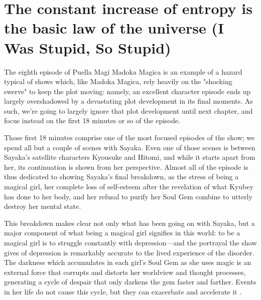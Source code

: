 \chapter{The constant increase of entropy is the basic law of the universe (I Was Stupid, So Stupid)}
The eighth episode of Puella Magi Madoka Magica is an example of a hazard typical of shows which, like Madoka Magica, rely heavily on the "shocking swerve" \cite{ref54} to keep the plot moving: namely, an excellent character episode ends up largely overshadowed by a devastating plot development in its final moments. As such, we're going to largely ignore that plot development until next chapter, and focus instead on the first 18 minutes or so of the episode.

Those first 18 minutes comprise one of the most focused episodes of the show; we spend all but a couple of scenes with Sayaka. Even one of those scenes is between Sayaka's satellite characters Kyousuke and Hitomi, and while it starts apart from her, its continuation is shown from her perspective. Almost all of the episode is thus dedicated to showing Sayaka's final breakdown, as the stress of being a magical girl, her complete loss of self-esteem after the revelation of what Kyubey has done to her body, and her refusal to purify her Soul Gem combine to utterly destroy her mental state.

This breakdown makes clear not only what has been going on with Sayaka, but a major component of what being a magical girl signifies in this world: to be a magical girl is to struggle constantly with depression—and the portrayal the show gives of depression is remarkably accurate to the lived experience of the disorder. The darkness which accumulates in each girl's Soul Gem as she uses magic is an external force that corrupts and distorts her worldview and thought processes, generating a cycle of despair that only darkens the gem faster and farther. Events in her life do not cause this cycle, but they can exacerbate and accelerate it \cite{ref55}. 

